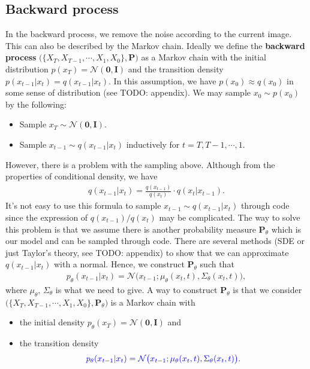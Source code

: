 \documentclass[
]{article}
\providecommand{\tightlist}{%
  \setlength{\itemsep}{0pt}\setlength{\parskip}{0pt}}\usepackage{longtable,booktabs,array}
\theoremstyle{remark}
\begin{document}
\subsection{Backward process}\label{backward-process}

In the backward process, we remove the noise according to the current
image. This can also be described by the Markov chain. Ideally we define
the \textbf{backward process}
\(\bigl( \lbrace X_T,X_{T-1},\cdots,X_1,X_0 \rbrace, \mathbf{P} \bigr)\)
as a Markov chain with the initial distribution
\(p(x_T) = \mathcal{N}(\mathbf{0},\mathbf{I})\) and the transition
density \(p(x_{t-1}\vert x_t)=q(x_{t-1}\vert x_t).\) In this assumption,
we have \(p(x_0)\approx q(x_0)\) in some sense of distribution (see
TODO: appendix). We may sample \(x_0\sim p(x_0)\) by the following:

\begin{itemize}
\tightlist
\item
  Sample \(x_T\sim \mathcal{N}(\mathbf{0},\mathbf{I}).\)
\item
  Sample \(x_{t-1}\sim q(x_{t-1}\vert x_t)\) inductively for
  \(t=T,T-1,\cdots,1.\)
\end{itemize}

However, there is a problem with the sampling above. Although from the
properties of conditional density, we have \[
\begin{aligned}
  q(x_{t-1}\vert x_t) = \frac{q(x_{t-1})}{q(x_t)} \cdot q(x_t\vert x_{t-1}).
\end{aligned}
\] It's not easy to use this formula to sample
\(x_{t-1}\sim q(x_{t-1}\vert x_t)\) through code since the expression of
\(q(x_{t-1})/q(x_t)\) may be complicated. The way to solve this problem
is that we assume there is another probability measure
\(\mathbf{P}_{\theta}\) which is our model and can be sampled through
code. There are several methods (SDE or just Taylor's theory, see TODO:
appendix) to show that we can approximate \(q(x_{t-1}\vert x_t)\) with a
normal. Hence, we construct \(\mathbf{P}_{\theta}\) such that \[
\begin{aligned}
  p_{\theta}(x_{t-1}\vert x_t) = \mathcal{N}\bigl(x_{t-1}; \mu_{\theta}(x_t,t),\Sigma_{\theta}(x_t,t)\bigr),
\end{aligned}
\] where \(\mu_{\theta},\, \Sigma_{\theta}\) is what we need to give. A
way to construct \(\mathbf{P}_{\theta}\) is that we consider
\(\bigl( \lbrace X_T,X_{T-1},\cdots, X_1,X_0\rbrace,\mathbf{P}_{\theta} \bigr)\)
is a Markov chain with

\begin{itemize}
\tightlist
\item
  the initial density
  \(p_{\theta}(x_T) = \mathcal{N}(\mathbf{0},\mathbf{I})\) and
\item
  the transition density \[
  \begin{aligned}
    \color{blue}{p_{\theta}(x_{t-1}\vert x_t) = \mathcal{N}\bigl(x_{t-1}; \mu_{\theta}(x_t,t),\Sigma_{\theta}(x_t,t)\bigr).}
  \end{aligned}
  \]
\end{itemize}
\end{document}
